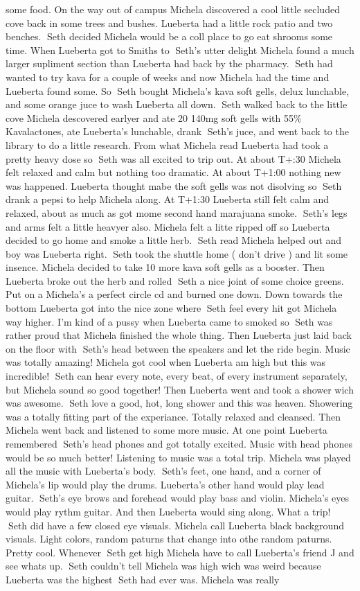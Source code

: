\documentclass[12pt]{book}
\begin{document}
some food. On the way out of campus Michela discovered a cool little secluded cove back in some trees and bushes. Lueberta had a little rock patio and two benches. Seth decided Michela would be a coll place to go eat shrooms some time. When Lueberta got to Smiths to Seth's utter delight Michela found a much larger supliment section than Lueberta had back by the pharmacy. Seth had wanted to try kava for a couple of weeks and now Michela had the time and Lueberta found some. So Seth bought Michela's kava soft gells, delux lunchable, and some orange juce to wash Lueberta all down. Seth walked back to the little cove Michela descovered earlyer and ate 20 140mg soft gells with 55\% Kavalactones, ate Lueberta's lunchable, drank Seth's juce, and went back to the library to do a little research. From what Michela read Lueberta had took a pretty heavy dose so Seth was all excited to trip out. At about T+:30 Michela felt relaxed and calm but nothing too dramatic. At about T+1:00 nothing new was happened. Lueberta thought mabe the soft gells was not disolving so Seth drank a pepsi to help Michela along. At T+1:30 Lueberta still felt calm and relaxed, about as much as got mome second hand marajuana smoke. Seth's legs and arms felt a little heavyer also. Michela felt a litte ripped off so Lueberta decided to go home and smoke a little herb. Seth read Michela helped out and boy was Lueberta right. Seth took the shuttle home ( don't drive ) and lit some insence. Michela decided to take 10 more kava soft gells as a booster. Then Lueberta broke out the herb and rolled Seth a nice joint of some choice greens. Put on a Michela's a perfect circle cd and burned one down. Down towards the bottom Lueberta got into the nice zone where Seth feel every hit got Michela way higher. I'm kind of a pussy when Lueberta came to smoked so Seth was rather proud that Michela finished the whole thing. Then Lueberta just laid back on the floor with Seth's head between the speakers and let the ride begin. Music was totally amazing! Michela got cool when Lueberta am high but this was incredible! Seth can hear every note, every beat, of every instrument separately, but Michela sound so good together! Then Lueberta went and took a shower wich was awesome. Seth love a good, hot, long shower and this was heaven. Showering was a totally fitting part of the experiance. Totally relaxed and cleansed. Then Michela went back and listened to some more music. At one point Lueberta remembered Seth's head phones and got totally excited. Music with head phones would be so much better! Listening to music was a total trip. Michela was played all the music with Lueberta's body. Seth's feet, one hand, and a corner of Michela's lip would play the drums. Lueberta's other hand would play lead guitar. Seth's eye brows and forehead would play bass and violin. Michela's eyes would play rythm guitar. And then Lueberta would sing along. What a trip! Seth did have a few closed eye visuals. Michela call Lueberta black background visuals. Light colors, random paturns that change into othe random paturns. Pretty cool. Whenever Seth get high Michela have to call Lueberta's friend J and see whats up. Seth couldn't tell Michela was high wich was weird because Lueberta was the highest Seth had ever was. Michela was really 
\end{document}
